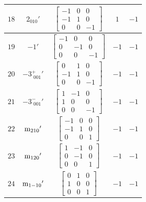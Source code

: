 \documentclass[fleqn,8pt]{jsarticle}
\begin{document}
\begin{longtable}{ccccc}
$ 18 $ & $ 2{}_{010}{}' $ & $ \begin{bmatrix} -1 & 0 & 0 \\ -1 & 1 & 0 \\ 0 & 0 & -1 \end{bmatrix} $ & $ 1 $ & $ -1 $ \\ \hline
$ 19 $ & $ -1{}' $ & $ \begin{bmatrix} -1 & 0 & 0 \\ 0 & -1 & 0 \\ 0 & 0 & -1 \end{bmatrix} $ & $ -1 $ & $ -1 $ \\ \hline
$ 20 $ & $ -3^{+}_{\,\,001}{}' $ & $ \begin{bmatrix} 0 & 1 & 0 \\ -1 & 1 & 0 \\ 0 & 0 & -1 \end{bmatrix} $ & $ -1 $ & $ -1 $ \\ \hline
$ 21 $ & $ -3^{-}_{\,\,001}{}' $ & $ \begin{bmatrix} 1 & -1 & 0 \\ 1 & 0 & 0 \\ 0 & 0 & -1 \end{bmatrix} $ & $ -1 $ & $ -1 $ \\ \hline
$ 22 $ & $ {\rm m}_{210}{}' $ & $ \begin{bmatrix} -1 & 0 & 0 \\ -1 & 1 & 0 \\ 0 & 0 & 1 \end{bmatrix} $ & $ -1 $ & $ -1 $ \\ \hline
$ 23 $ & $ {\rm m}_{120}{}' $ & $ \begin{bmatrix} 1 & -1 & 0 \\ 0 & -1 & 0 \\ 0 & 0 & 1 \end{bmatrix} $ & $ -1 $ & $ -1 $ \\ \hline
$ 24 $ & $ {\rm m}_{1-10}{}' $ & $ \begin{bmatrix} 0 & 1 & 0 \\ 1 & 0 & 0 \\ 0 & 0 & 1 \end{bmatrix} $ & $ -1 $ & $ -1 $ \\
\end{longtable}
\end{document}

